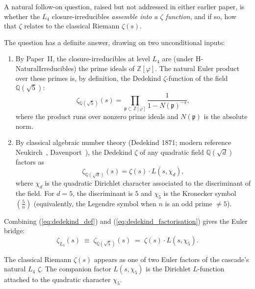 \documentclass[11pt,a4paper]{article}
\theoremstyle{definition}
\theoremstyle{remark}
\begin{document}
A natural follow-on question, raised but not addressed in either earlier
paper, is whether the $L_4$ closure-irreducibles \emph{assemble into a
$\zeta$ function}, and if so, how that $\zeta$ relates to the classical
Riemann $\zeta(s)$.

The question has a definite answer, drawing on two unconditional inputs:

\begin{enumerate}
\item By Paper~II, the closure-irreducibles at level $L_4$ are
      (under H-NaturalIrreducibles) the prime ideals of
      $\mathbb{Z}[\varphi]$. The natural Euler product over these primes
      is, by definition, the Dedekind $\zeta$-function of the field
      $\mathbb{Q}(\sqrt{5})$:
      \begin{equation}\label{eq:dedekind_def}
        \zeta_{\mathbb{Q}(\sqrt{5})}(s)
          = \prod_{\mathfrak{p} \subset \mathbb{Z}[\varphi]}
              \frac{1}{1 - N(\mathfrak{p})^{-s}},
      \end{equation}
      where the product runs over nonzero prime ideals and $N(\mathfrak{p})$
      is the absolute norm.
\item By classical algebraic number theory (Dedekind 1871; modern
      reference Neukirch~\cite{Neukirch1999}, Davenport~\cite{Davenport2000}),
      the Dedekind $\zeta$ of any quadratic field $\mathbb{Q}(\sqrt{d})$
      factors as
      \begin{equation}\label{eq:dedekind_factorisation}
        \zeta_{\mathbb{Q}(\sqrt{d})}(s)
          = \zeta(s) \cdot L(s, \chi_d),
      \end{equation}
      where $\chi_d$ is the quadratic Dirichlet character associated to
      the discriminant of the field. For $d = 5$, the discriminant is
      $5$ and $\chi_5$ is the Kronecker symbol $\left(\tfrac{5}{n}\right)$
      (equivalently, the Legendre symbol when $n$ is an odd prime
      $\neq 5$).
\end{enumerate}

Combining (\ref{eq:dedekind_def}) and (\ref{eq:dedekind_factorisation})
gives the Euler bridge:
\begin{equation}\label{eq:euler_bridge}
  \zeta_{L_4}(s)
    \;\equiv\;
    \zeta_{\mathbb{Q}(\sqrt{5})}(s)
    \;=\;
    \zeta(s) \cdot L(s, \chi_5).
\end{equation}

The classical Riemann $\zeta(s)$ appears as one of two Euler factors
of the cascade's natural $L_4$ $\zeta$. The companion factor
$L(s, \chi_5)$ is the Dirichlet $L$-function attached to the quadratic
character $\chi_5$.
\end{document}
